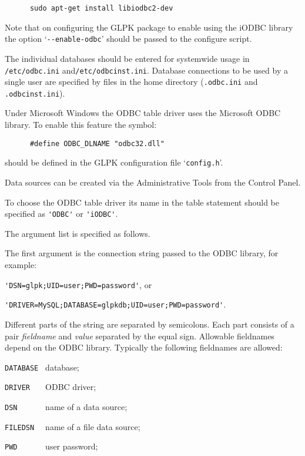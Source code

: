 \documentclass[11pt]{report}
\def\para#1{\noindent{\bf#1}}
\begin{document}
\begin{verbatim}
      sudo apt-get install libiodbc2-dev
\end{verbatim}

Note that on configuring the GLPK package to enable using the iODBC
library the option `\verb|--enable-odbc|' should be passed to the
configure script.

The individual databases should be entered for systemwide usage in
\verb|/etc/odbc.ini| and\linebreak \verb|/etc/odbcinst.ini|. Database
connections to be used by a single user are specified by files in the
home directory (\verb|.odbc.ini| and \verb|.odbcinst.ini|).

\para{Microsoft Windows.}
Under Microsoft Windows the ODBC table driver uses the Microsoft ODBC
library. To enable this feature the symbol:

\begin{verbatim}
      #define ODBC_DLNAME "odbc32.dll"
\end{verbatim}

\noindent
should be defined in the GLPK configuration file `\verb|config.h|'.

Data sources can be created via the Administrative Tools from the
Control Panel.

To choose the ODBC table driver its name in the table statement should
be specified as \verb|'ODBC'| or \verb|'iODBC'|.

\newpage

The argument list is specified as follows.

The first argument is the connection string passed to the ODBC library,
for example:

\verb|'DSN=glpk;UID=user;PWD=password'|, or

\verb|'DRIVER=MySQL;DATABASE=glpkdb;UID=user;PWD=password'|.

Different parts of the string are separated by semicolons. Each part
consists of a pair {\it fieldname} and {\it value} separated by the
equal sign. Allowable fieldnames depend on the ODBC library. Typically
the following fieldnames are allowed:

\verb|DATABASE | database;

\verb|DRIVER   | ODBC driver;

\verb|DSN      | name of a data source;

\verb|FILEDSN  | name of a file data source;

\verb|PWD      | user password;
\end{document}
